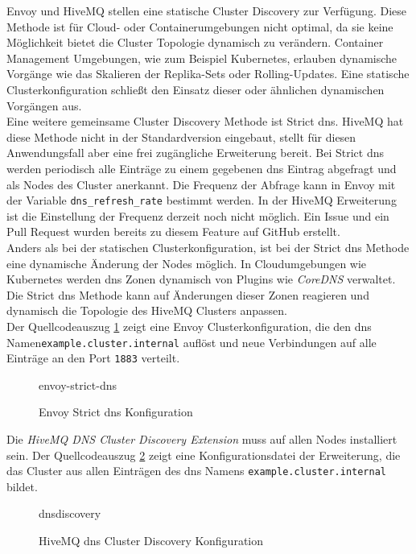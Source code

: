Envoy und HiveMQ stellen eine statische Cluster Discovery zur Verfügung. Diese Methode ist für Cloud- oder Containerumgebungen nicht optimal, da sie keine Möglichkeit bietet die Cluster Topologie dynamisch zu verändern. Container Management Umgebungen, wie zum Beispiel Kubernetes, erlauben dynamische Vorgänge wie das Skalieren der Replika-Sets oder Rolling-Updates. Eine statische Clusterkonfiguration schlie{\ss}t den Einsatz dieser oder ähnlichen dynamischen Vorgängen aus.\\
Eine weitere gemeinsame Cluster Discovery Methode ist Strict \ac{dns}. HiveMQ hat diese Methode nicht in der Standardversion eingebaut, stellt für diesen Anwendungsfall aber eine frei zugängliche Erweiterung bereit.
Bei Strict \ac{dns} werden periodisch alle Einträge zu einem gegebenen \ac{dns} Eintrag abgefragt und als Nodes des Cluster anerkannt. Die Frequenz der Abfrage kann in Envoy mit der Variable \verb|dns_refresh_rate| bestimmt werden. In der HiveMQ Erweiterung ist die Einstellung der Frequenz derzeit noch nicht möglich. Ein Issue \cite{AllowConfigurationDiscovery} und ein Pull Request \cite{ExponentialBackoffGeneral} wurden bereits zu diesem Feature auf GitHub erstellt.
\\
Anders als bei der statischen Clusterkonfiguration, ist bei der Strict \ac{dns} Methode eine dynamische Änderung der Nodes möglich. In Cloudumgebungen wie Kubernetes werden \ac{dns} Zonen dynamisch von Plugins wie \textit{CoreDNS} verwaltet.\cite{DNSServicesPods}
Die Strict \ac{dns} Methode kann auf Änderungen dieser Zonen reagieren und dynamisch die Topologie des HiveMQ Clusters anpassen.
\\
Der Quellcodeauszug \ref{code:envoy-strict-dns} zeigt eine Envoy Clusterkonfiguration, die den \ac{dns} Namen\newline \verb|example.cluster.internal| auflöst und neue Verbindungen auf alle Einträge an den Port \verb|1883| verteilt.
\begin{figure}
    {envoy-strict-dns}
    \caption{Envoy Strict \ac{dns} Konfiguration}
    \label{code:envoy-strict-dns}
\end{figure}
Die \textit{HiveMQ DNS Cluster Discovery Extension} \cite{HiveMQExtensionDNS} muss auf allen Nodes installiert sein. Der Quellcodeauszug \ref{code:hivemq-dnsdiscovery} zeigt eine Konfigurationsdatei der Erweiterung, die das Cluster aus allen Einträgen des \ac{dns} Namens \verb|example.cluster.internal| bildet.
\begin{figure}
    {dnsdiscovery}
    \caption{HiveMQ \ac{dns} Cluster Discovery Konfiguration}
    \label{code:hivemq-dnsdiscovery}
\end{figure}


